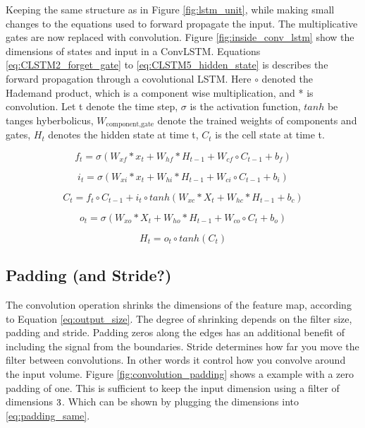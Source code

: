 \documentclass{article}
\begin{document}


Keeping the same structure as in Figure \ref{fig:lstm_unit}, while making small changes to the equations used to forward propagate the input. The multiplicative gates are now replaced with convolution. 
Figure \ref{fig:inside_conv_lstm} show the dimensions of states and input in a ConvLSTM. Equations \eqref{eq:CLSTM2_forget_gate} to \eqref{eq:CLSTM5_hidden_state} is describes the forward propagation through a covolutional LSTM. Here $\circ$ denoted the Hademand product, which is a component wise multiplication, and * is convolution. Let t denote the time step, $\sigma$ is the activation function, $tanh$ be tanges hyberbolicus, $W_{\text{component}, \text{gate}}$ denote the trained weights of components and gates, $H_{t}$ denotes the hidden state at time t, $C_{t}$ is the cell state at time t. 

\begin{equation} \label{eq:CLSTM2_forget_gate}
        f_t = \sigma \left( W_{xf}*x_t + W_{hf}*H_{t-1} + W_{cf}\circ C_{t-1}+b_f \right)
\end{equation}

\begin{equation} \label{eq:CLSTM1_input_gate}
    i_t = \sigma \left( W_{xi}*x_t + W_{hi}*H_{t-1} + W_{ci}\circ C_{t-1}+b_i \right) 
\end{equation}

\begin{equation} \label{eq:CLSTM3_cellstate}
        C_t = f_t \circ C_{t-1} +i_t\circ tanh\left( W_{xc}*X_t + W_{hc}*H_{t-1} + b_c \right)
\end{equation}

\begin{equation} \label{eq:CLSTM4_output_gate}
        o_t = \sigma \left( W_{xo}*X_t + W_{ho}*H_{t-1} + W_{co}\circ C_{t}+b_o \right)
\end{equation}

\begin{equation} \label{eq:CLSTM5_hidden_state}
        H_t = o_t \circ tanh \left( C_t \right)
\end{equation}

\subsection{Padding (and Stride?)} \label{sec:padding}
The convolution operation shrinks the dimensions of the feature map, according to Equation \eqref{eq:output_size}. The degree of shrinking  depends on the  filter size, padding and stride. Padding zeros along the edges has an additional benefit of including the signal from the boundaries. Stride determines how far you move the filter between convolutions. In other words it control how you convolve around the input volume. Figure \ref{fig:convolution_padding} shows a example with a zero padding of one. This is sufficient to keep the input dimension using a filter of dimensions $3 \time 3$. Which can be shown by plugging the dimensions into \eqref{eq:padding_same}.
\end{document}
